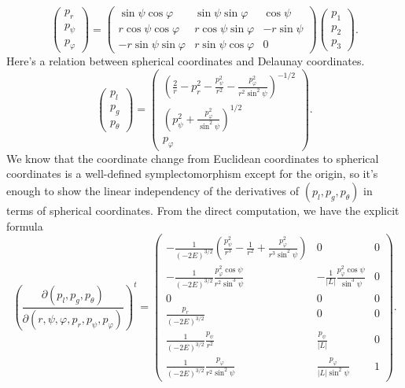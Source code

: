 \documentclass{amsart}
\newcommand{\vp}{\varphi}
\newcommand{\pp}{\partial}
\begin{document}
	$$
	\begin{pmatrix}
		p_r\\
		p_\psi\\
		p_\vp
	\end{pmatrix}
	=
	\begin{pmatrix}
		\sin\psi \cos\vp &	\sin\psi\sin\vp&	\cos\psi\\
		r\cos\psi\cos\vp&	r\cos\psi\sin\vp&	-r\sin\psi\\
		-r\sin\psi\sin\vp&	r\sin\psi\cos\vp&	0
	\end{pmatrix}
	\begin{pmatrix}
		p_1\\
		p_2\\
		p_3
	\end{pmatrix}.
	$$
Here's a relation between spherical coordinates and Delaunay coordinates.
$$
\begin{pmatrix}
	p_l\\
	p_g\\
	p_\theta
\end{pmatrix}
=
\begin{pmatrix}
	\left(\frac{2}{r}-p_r^2-\frac{p_\psi^2}{r^2}-\frac{p_\vp^2}{r^2\sin^2\psi}\right)^{-1/2}\\
	\left(p_\psi^2 + \frac{p_\vp^2}{\sin^2 \psi}\right)^{1/2}\\
	p_\vp
\end{pmatrix}.
$$
We know that the coordinate change from Euclidean coordinates to spherical coordinates is a well-defined symplectomorphism except for the origin, so it's enough to show the linear independency of the derivatives of $(p_l,p_g,p_\theta)$ in terms of spherical coordinates.
From the direct computation, we have the explicit formula
	$$
\left(\frac{\pp (p_l,p_g,p_\theta)}{\pp(r,\psi,\vp,p_r,p_\psi,p_\vp)}\right)^t
=
\begin{pmatrix}
	-\frac{1}{(-2E)^{3/2}}\left(\frac{p_\psi^2}{r^3} - \frac{1}{r^2} + \frac{p_\vp^2}{r^3\sin^2\psi}\right)
	&
	0
	&
	0
	\\
	-\frac{1}{(-2E)^{3/2}}\frac{p_\vp^2\cos\psi}{r^2\sin^3\psi}
	&
	-\frac{1}{|L|}\frac{p_\vp^2\cos\psi}{\sin^3\psi}
	&
	0
	\\0
	&
	0
	&
	0
	\\\frac{p_r}{(-2E)^{3/2}}
	&
	0
	&
	0
	\\\frac{1}{(-2E)^{3/2}}\frac{p_\psi}{r^2}
	&
	\frac{p_\psi}{|L|}
	&
	0
	\\\frac{1}{(-2E)^{3/2}}\frac{p_\vp}{r^2\sin^2\psi}
	&
	\frac{p_\vp}{|L|\sin^2\psi}
	&
	1
\end{pmatrix}.
$$
\end{document}
